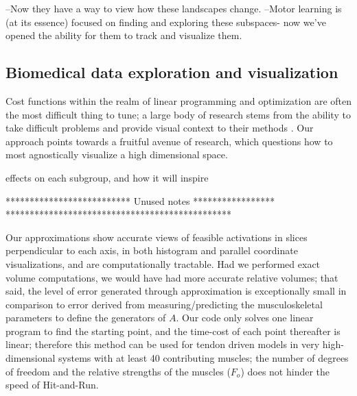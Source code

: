 %
%
%


--Now they have a way to view how these landscapes change. 
--Motor learning is (at its essence) focused on finding and exploring these subspaces- now we've opened the ability for them to track and visualize them.

\subsection*{Biomedical data exploration and visualization}
Cost functions within the realm of linear programming and optimization are often the most difficult thing to tune; a large body of research stems from the ability to take difficult problems and provide visual context to their methods \cite{CHATTERJEE19931725}. Our approach points towards a fruitful avenue of research, which questions how to most agnostically visualize a high dimensional space. 

effects on each subgroup, and how it will inspire



************************** Unused notes *****************
***********************************************





Our approximations show accurate views of feasible activations in slices perpendicular to each axis, in both histogram and parallel coordinate visualizations, and are computationally tractable.
Had we performed exact volume computations, we would have had more accurate relative volumes; that said, the level of error generated through approximation is exceptionally small in comparison to error derived from measuring/predicting the musculoskeletal parameters to define the generators of $A$.
Our code only solves one linear program to find the starting point, and the time-cost of each point thereafter is linear; therefore this method can be used for tendon driven models in very high-dimensional systems with at least 40 contributing muscles; the number of degrees of freedom and the relative strengths of the muscles ($F_o$) does not hinder the speed of Hit-and-Run.\\

